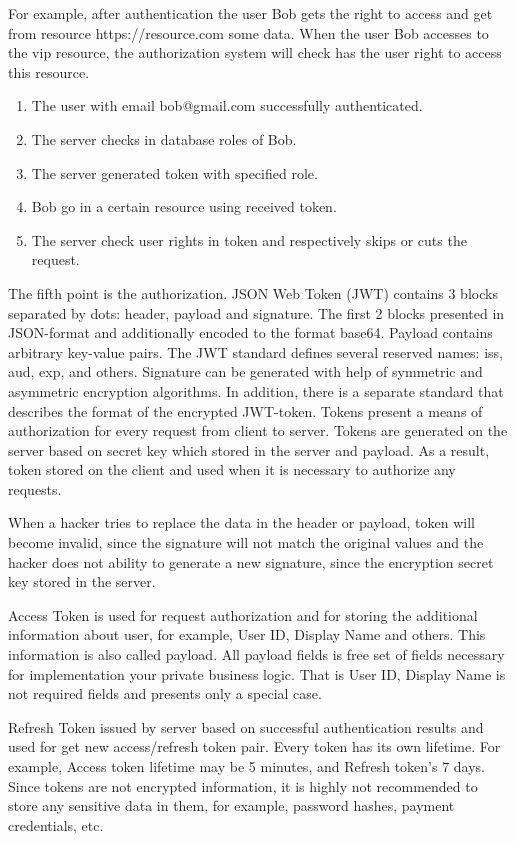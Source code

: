 For example, after authentication the user Bob gets the right to access and get from resource
https://resource.com some data.
When the user Bob accesses to the vip resource, the authorization system will check has the user right to access
this resource.

\begin{enumerate}
    \item The user with email bob@gmail.com successfully authenticated.
    \item The server checks in database roles of Bob.
    \item The server generated token with specified role.
    \item Bob go in a certain resource using received token.
    \item The server check user rights in token and respectively skips or cuts the request.
\end{enumerate}

The fifth point is the authorization.
JSON Web Token (JWT) contains 3 blocks separated by dots: header, payload and signature.
The first 2 blocks presented in JSON-format and additionally encoded to the format base64.
Payload contains arbitrary key-value pairs.
The JWT standard defines several reserved names: iss, aud, exp, and others.
Signature can be generated with help of symmetric and asymmetric encryption algorithms.
In addition, there is a separate standard that describes the format of the encrypted JWT-token.
Tokens present a means of authorization for every request from client to server.
Tokens are generated on the server based on secret key which stored in the server and payload.
As a result, token stored on the client and used when it is necessary to authorize any requests.

When a hacker tries to replace the data in the header or payload, token will become invalid, since the signature
will not match the original values and the hacker does not ability to generate a new signature,
since the encryption secret key stored in the server.

Access Token is used for request authorization and for storing the additional information about user, for example,
User ID, Display Name and others.
This information is also called payload.
All payload fields is free set of fields necessary for implementation your private business logic.
That is User ID, Display Name is not required fields and presents only a special case.

Refresh Token issued by server based on successful authentication results and used for get new access/refresh token pair.
Every token has its own lifetime.
For example, Access token lifetime may be 5 minutes, and Refresh token's 7 days.
Since tokens are not encrypted information, it is highly not recommended to store any sensitive data in them, for example,
password hashes, payment credentials, etc.

